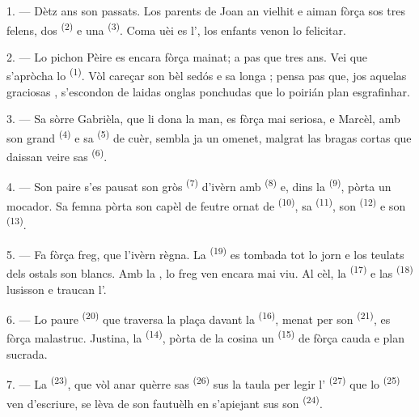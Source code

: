 \VUsaut{3.0mm}

1. --- Dètz ans son passats. Los parents de Joan an vielhit e aiman fòrça sos
tres felens, dos  \textsuperscript{(2)} e una 
\textsuperscript{(3)}. Coma uèi es l', los enfants
venon lo felicitar.

2. --- Lo pichon Pèire es encara fòrça mainat; a pas que tres ans. Vei que
s'apròcha lo  \textsuperscript{(1)}. Vòl careçar son bèl 
sedós e sa longa ; pensa pas que, jos aquelas graciosas
, s'escondon de laidas onglas ponchudas que lo poirián plan
esgrafinhar.

3. --- Sa sòrre Gabrièla, que li dona la man, es fòrça mai seriosa, e Marcèl, amb
son grand  \textsuperscript{(4)} e sa 
\textsuperscript{(5)} de cuèr, sembla ja un omenet, malgrat las bragas cortas que
daissan veire sas  \textsuperscript{(6)}.

4. --- Son paire s'es pausat son gròs  \textsuperscript{(7)}
d'ivèrn amb  \textsuperscript{(8)} e, dins la
 \textsuperscript{(9)}, pòrta un mocador. Sa femna pòrta son capèl
de feutre ornat de  \textsuperscript{(10)}, sa 
\textsuperscript{(11)}, son  \textsuperscript{(12)} e son
 \textsuperscript{(13)}.

5. --- Fa fòrça freg, que l'ivèrn règna. La  \textsuperscript{(19)} es
tombada tot lo jorn e los teulats dels ostals son blancs. Amb la ,
lo freg ven encara mai viu. Al cèl, la  \textsuperscript{(17)} e las
 \textsuperscript{(18)} lusisson e traucan l'.

\VUsaut{4.2mm}
\VUsaut{3.0mm}

6. --- Lo paure  \textsuperscript{(20)} que traversa la plaça davant
la  \textsuperscript{(16)}, menat per son 
\textsuperscript{(21)}, es fòrça malastruc. Justina, la 
\textsuperscript{(14)}, pòrta de la cosina un  \textsuperscript{(15)}
de  fòrça cauda e plan sucrada.

7. --- La  \textsuperscript{(23)}, que vòl anar quèrre sas
 \textsuperscript{(26)} sus la taula per legir l'
\textsuperscript{(27)} que lo  \textsuperscript{(25)} ven
d'escriure, se lèva de son fautuèlh en s'apiejant sus son 
\textsuperscript{(24)}.

